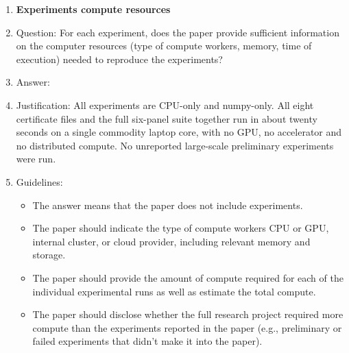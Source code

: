 \begin{enumerate}
\begin{itemize}
        \item It should be clear whether the error bar is the standard deviation or the standard error of the mean.
        \item It is OK to report 1-sigma error bars, but one should state it. The authors should preferably report a 2-sigma error bar than state that they have a 96\% CI, if the hypothesis of Normality of errors is not verified.
        \item For asymmetric distributions, the authors should be careful not to show in tables or figures symmetric error bars that would yield results that are out of range (e.g., negative error rates).
        \item If error bars are reported in tables or plots, the authors should explain in the text how they were calculated and reference the corresponding figures or tables in the text.
    \end{itemize}

\item {\bf Experiments compute resources}
    \item[] Question: For each experiment, does the paper provide sufficient information on the computer resources (type of compute workers, memory, time of execution) needed to reproduce the experiments?
    \item[] Answer: \answerYes{}
    \item[] Justification: All experiments are CPU-only and numpy-only. All eight certificate files and the full six-panel suite together run in about twenty seconds on a single commodity laptop core, with no GPU, no accelerator and no distributed compute. No unreported large-scale preliminary experiments were run.
    \item[] Guidelines:
    \begin{itemize}
        \item The answer \answerNA{} means that the paper does not include experiments.
        \item The paper should indicate the type of compute workers CPU or GPU, internal cluster, or cloud provider, including relevant memory and storage.
        \item The paper should provide the amount of compute required for each of the individual experimental runs as well as estimate the total compute. 
        \item The paper should disclose whether the full research project required more compute than the experiments reported in the paper (e.g., preliminary or failed experiments that didn't make it into the paper). 
    \end{itemize}
    

\end{enumerate}
